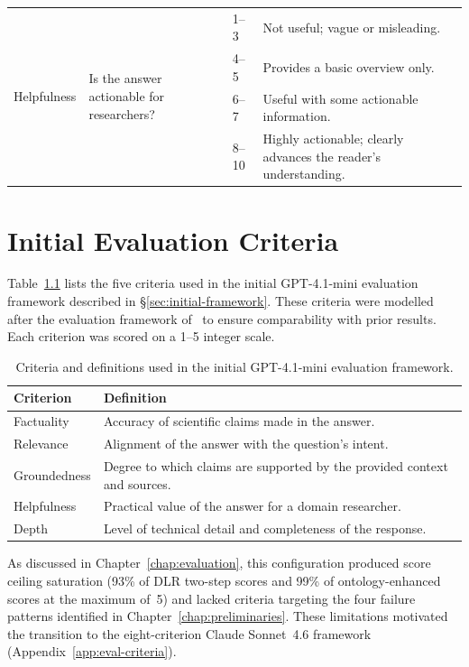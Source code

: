 \begin{longtable}{@{}p{2.6cm} p{4.0cm} p{1.2cm} p{6.0cm}@{}}
\multirow{4}{2.6cm}{Helpfulness}
& \multirow{4}{4.0cm}{Is the answer actionable for researchers?}
& 1--3 & Not useful; vague or misleading. \\
& & 4--5 & Provides a basic overview only. \\
& & 6--7 & Useful with some actionable information. \\
& & 8--10 & Highly actionable; clearly advances the reader's understanding. \\
\bottomrule
\end{longtable}

\chapter{Initial Evaluation Criteria}\label{app:initial-criteria}

Table~\ref{tab:initial-criteria-full} lists the five criteria used in
the initial GPT-4.1-mini evaluation framework described in
\S\ref{sec:initial-framework}. These criteria were modelled after the
evaluation framework of~\citet{elbaff2025earthobservationrag} to ensure
comparability with prior results. Each criterion was scored on a 1--5
integer scale.

\begin{table}[htbp]
\centering
\caption{Criteria and definitions used in the initial GPT-4.1-mini evaluation framework.}
\label{tab:initial-criteria-full}
\begin{tabularx}{\textwidth}{lX}
\toprule
\textbf{Criterion} & \textbf{Definition} \\
\midrule
Factuality & Accuracy of scientific claims made in the answer. \\
Relevance & Alignment of the answer with the question's intent. \\
Groundedness & Degree to which claims are supported by the provided context and sources. \\
Helpfulness & Practical value of the answer for a domain researcher. \\
Depth & Level of technical detail and completeness of the response. \\
\bottomrule
\end{tabularx}
\end{table}

As discussed in Chapter~\ref{chap:evaluation}, this configuration
produced score ceiling saturation (93\% of DLR two-step scores and 99\%
of ontology-enhanced scores at the maximum of~5) and lacked criteria
targeting the four failure patterns identified in
Chapter~\ref{chap:preliminaries}. These limitations motivated the
transition to the eight-criterion Claude Sonnet~4.6 framework
(Appendix~\ref{app:eval-criteria}).

